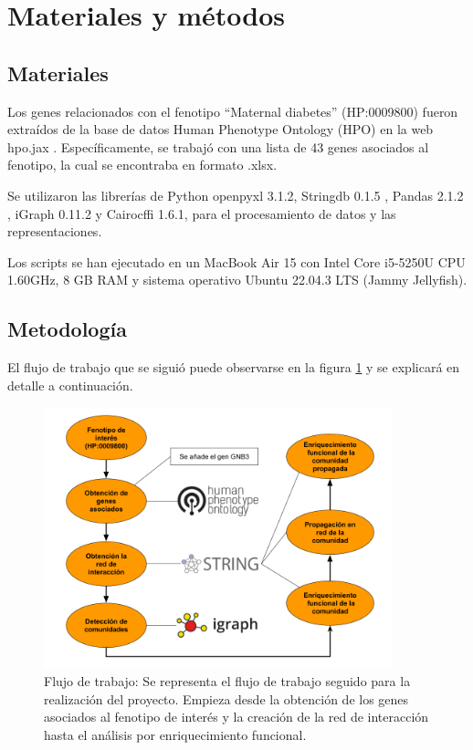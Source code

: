 \section{Materiales y métodos}

\subsection{Materiales}
Los genes relacionados con el fenotipo ``Maternal diabetes'' (HP:0009800) fueron extraídos de la base de datos Human Phenotype Ontology (HPO) en la web hpo.jax \cite{Kohler2017}. Específicamente, se trabajó con una lista de 43 genes asociados al fenotipo, la cual se encontraba en formato .xlsx.

Se utilizaron las librerías de Python
openpyxl 3.1.2, Stringdb 0.1.5 \cite{Mering2005}, Pandas 2.1.2 \cite{McKinney2015}, iGraph 0.11.2 \cite{Csardi2006} y Cairocffi 1.6.1, para el procesamiento de datos y las representaciones.

Los scripts se han ejecutado en un MacBook Air 15 con Intel Core i5-5250U CPU 1.60GHz, 8 GB RAM y sistema operativo Ubuntu 22.04.3 LTS (Jammy Jellyfish).

\subsection{Metodología}

El flujo de trabajo que se siguió puede observarse en la figura \ref{fig:workflow} y se explicará en detalle a continuación.

\begin{figure}[h!]
	\includegraphics[width=0.9\textwidth]{figures/workflow.png}
	\caption{Flujo de trabajo: Se representa el flujo de trabajo seguido para la realización del proyecto. Empieza desde la obtención de los genes asociados al fenotipo de interés y la creación de la red de interacción hasta el análisis por enriquecimiento funcional.}
	\label{fig:workflow}
\end{figure}

